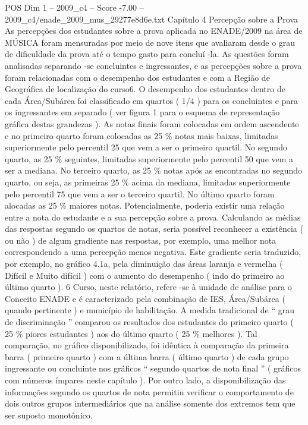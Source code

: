\begin{textsample}{POS Dim 1 – 2009\_c4 – Score -7.00 – 2009\_c4/enade\_2009\_mus\_29277e8d6e.txt}  \label{ex:f1_pos_417}
Capítulo 4 Percepção sobre a Prova As percepções dos estudantes sobre a prova aplicada no ENADE/2009 na área de MÚSICA foram mensuradas por meio de nove itens que avaliaram desde o grau de dificuldade da prova até o tempo gasto para concluí -la.
As questões foram analisadas separando -se concluintes e ingressantes, e as percepções sobre a prova foram relacionadas com o desempenho dos estudantes e com a Região de Geográfica de localização do curso6.
O desempenho dos estudantes dentro de cada Área/Subárea foi classificado em quartos ( 1/4 ) para os concluintes e para os ingressantes em separado ( ver figura 1 para o esquema de representação gráfica destas grandezas ).
As notas finais foram colocadas em ordem ascendente e no primeiro quarto foram colocadas as 25 \% notas mais baixas, limitadas superiormente pelo percentil 25 que vem a ser o primeiro quartil.
No segundo quarto, as 25 \% seguintes, limitadas superiormente pelo percentil 50 que vem a ser a mediana.
No terceiro quarto, as 25 \% notas após as encontradas no segundo quarto, ou seja, as primeiras 25 \% acima da mediana, limitadas superiormente pelo percentil 75 que vem a ser o terceiro quartil.
No último quarto foram alocadas as 25 \% maiores notas.
Potencialmente, poderia existir uma relação entre a nota do estudante e a sua percepção sobre a prova.
Calculando as médias das respostas segundo os quartos de notas, seria possível reconhecer a existência ( ou não ) de algum gradiente nas respostas, por exemplo, uma melhor nota correspondendo a uma percepção menos negativa.
Este gradiente seria traduzido, por exemplo, no gráfico 4.1a, pela diminuição das áreas laranja e vermelha ( Difícil e Muito difícil ) com o aumento do desempenho ( indo do primeiro ao último quarto ). 6 Curso, neste relatório, refere -se à unidade de análise para o Conceito ENADE e é caracterizado pela combinação de IES, Área/Subárea ( quando pertinente ) e município de habilitação.
A medida tradicional de “ grau de discriminação ” comparou os resultados dos estudantes do primeiro quarto ( 25 \% piores estudantes ) aos do último quarto ( 25 \% melhores ).
Tal comparação, no gráfico disponibilizado, foi idêntica à comparação da primeira barra ( primeiro quarto ) com a última barra ( último quarto ) de cada grupo ingressante ou concluinte nos gráficos “ segundo quartos de nota final ” ( gráficos com números ímpares neste capítulo ).
Por outro lado, a disponibilização das informações segundo os quartos de nota permitiu verificar o comportamento de dois outros grupos intermediários que na análise somente dos extremos tem que ser suposto monotônico.

\end{textsample}
